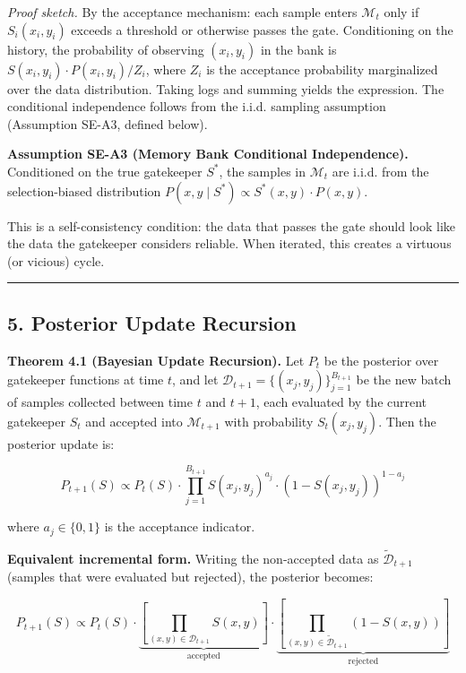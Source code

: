 \documentclass[
  12pt,
]{article}
\begin{document}
\emph{Proof sketch.} By the acceptance mechanism: each sample enters
\(\mathcal{M}_t\) only if \(S_i(x_i, y_i)\) exceeds a threshold or
otherwise passes the gate. Conditioning on the history, the probability
of observing \((x_i, y_i)\) in the bank is
\(S(x_i, y_i) \cdot P(x_i, y_i) / Z_i\), where \(Z_i\) is the acceptance
probability marginalized over the data distribution. Taking logs and
summing yields the expression. The conditional independence follows from
the i.i.d. sampling assumption (Assumption SE-A3, defined below).

\textbf{Assumption SE-A3 (Memory Bank Conditional Independence).}
Conditioned on the true gatekeeper \(S^*\), the samples in
\(\mathcal{M}_t\) are i.i.d. from the selection-biased distribution
\(P(x,y \mid S^*) \propto S^*(x,y) \cdot P(x,y)\).

This is a self-consistency condition: the data that passes the gate
should look like the data the gatekeeper considers reliable. When
iterated, this creates a virtuous (or vicious) cycle.

\begin{center}\rule{0.5\linewidth}{0.5pt}\end{center}

\subsection{5. Posterior Update
Recursion}\label{posterior-update-recursion}

\textbf{Theorem 4.1 (Bayesian Update Recursion).} Let \(P_t\) be the
posterior over gatekeeper functions at time \(t\), and let
\(\mathcal{D}_{t+1} = \{(x_j, y_j)\}_{j=1}^{B_{t+1}}\) be the new batch
of samples collected between time \(t\) and \(t+1\), each evaluated by
the current gatekeeper \(S_t\) and accepted into \(\mathcal{M}_{t+1}\)
with probability \(S_t(x_j, y_j)\). Then the posterior update is:

\[
P_{t+1}(S) \propto P_t(S) \cdot \prod_{j=1}^{B_{t+1}} S(x_j, y_j)^{a_j} \cdot (1 - S(x_j, y_j))^{1-a_j}
\]

where \(a_j \in \{0, 1\}\) is the acceptance indicator.

\textbf{Equivalent incremental form.} Writing the non-accepted data as
\(\tilde{\mathcal{D}}_{t+1}\) (samples that were evaluated but
rejected), the posterior becomes:

\[
P_{t+1}(S) \propto P_t(S) \cdot \underbrace{\left[\prod_{(x,y) \in \mathcal{D}_{t+1}} S(x,y)\right]}_{\text{accepted}} \cdot \underbrace{\left[\prod_{(x,y) \in \tilde{\mathcal{D}}_{t+1}} (1 - S(x,y))\right]}_{\text{rejected}}
\]
\end{document}
